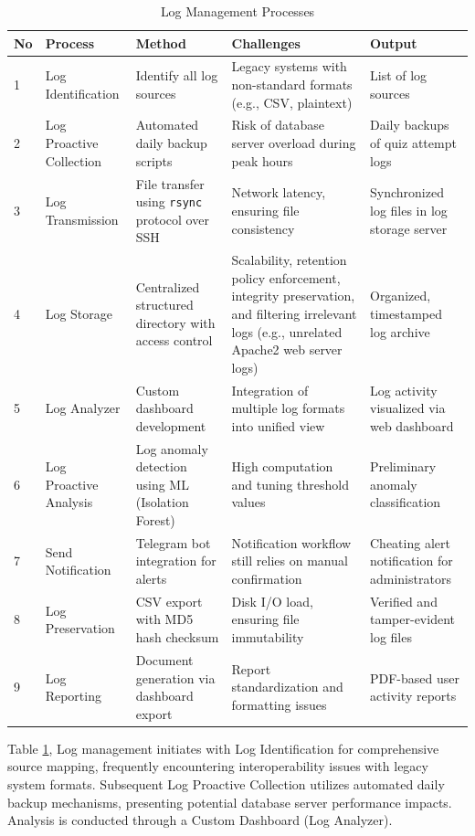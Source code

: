 \begin{table}[H]
\centering
\caption{Log Management Processes}
\label{tab:log-management-challanges-output-method}
\begin{tabularx}{\textwidth}{p{0.8cm} p{2.8cm} p{3.2cm} X X}
\toprule
\textbf{No} & \textbf{Process} & \textbf{Method} & \textbf{Challenges} & \textbf{Output} \\
\midrule
1 & Log Identification & Identify all log sources & Legacy systems with non-standard formats (e.g., CSV, plaintext) & List of log sources \\
2 & Log Proactive Collection & Automated daily backup scripts & Risk of database server overload during peak hours & Daily backups of quiz attempt logs \\
3 & Log Transmission & File transfer using \texttt{rsync} protocol over SSH & Network latency, ensuring file consistency & Synchronized log files in log storage server \\
4 & Log Storage & Centralized structured directory with access control & Scalability, retention policy enforcement, integrity preservation, and filtering irrelevant logs (e.g., unrelated Apache2 web server logs) & Organized, timestamped log archive \\
5 & Log Analyzer & Custom dashboard development & Integration of multiple log formats into unified view & Log activity visualized via web dashboard \\
6 & Log Proactive Analysis & Log anomaly detection using ML (Isolation Forest) & High computation and tuning threshold values & Preliminary anomaly classification \\
7 & Send Notification & Telegram bot integration for alerts & Notification workflow still relies on manual confirmation & Cheating alert notification for administrators \\
8 & Log Preservation & CSV export with MD5 hash checksum & Disk I/O load, ensuring file immutability & Verified and tamper-evident log files \\
9 & Log Reporting & Document generation via dashboard export & Report standardization and formatting issues & PDF-based user activity reports \\
\bottomrule
\end{tabularx}
\end{table}


Table \ref{tab:log-management-challanges-output-method}, Log management initiates with Log Identification for comprehensive source mapping, frequently encountering interoperability issues with legacy system formats. Subsequent Log Proactive Collection utilizes automated daily backup mechanisms, presenting potential database server performance impacts. Analysis is conducted through a Custom Dashboard (Log Analyzer).



